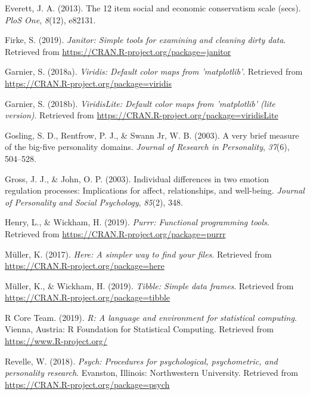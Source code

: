 \documentclass[man]{apa6}
\begin{document}
\leavevmode\hypertarget{ref-everett201312}{}%
Everett, J. A. (2013). The 12 item social and economic conservatism scale (secs). \emph{PloS One}, \emph{8}(12), e82131.

\leavevmode\hypertarget{ref-R-janitor}{}%
Firke, S. (2019). \emph{Janitor: Simple tools for examining and cleaning dirty data}. Retrieved from \url{https://CRAN.R-project.org/package=janitor}

\leavevmode\hypertarget{ref-R-viridis}{}%
Garnier, S. (2018a). \emph{Viridis: Default color maps from 'matplotlib'}. Retrieved from \url{https://CRAN.R-project.org/package=viridis}

\leavevmode\hypertarget{ref-R-viridisLite}{}%
Garnier, S. (2018b). \emph{ViridisLite: Default color maps from 'matplotlib' (lite version)}. Retrieved from \url{https://CRAN.R-project.org/package=viridisLite}

\leavevmode\hypertarget{ref-gosling2003very}{}%
Gosling, S. D., Rentfrow, P. J., \& Swann Jr, W. B. (2003). A very brief measure of the big-five personality domains. \emph{Journal of Research in Personality}, \emph{37}(6), 504--528.

\leavevmode\hypertarget{ref-gross2003individual}{}%
Gross, J. J., \& John, O. P. (2003). Individual differences in two emotion regulation processes: Implications for affect, relationships, and well-being. \emph{Journal of Personality and Social Psychology}, \emph{85}(2), 348.

\leavevmode\hypertarget{ref-R-purrr}{}%
Henry, L., \& Wickham, H. (2019). \emph{Purrr: Functional programming tools}. Retrieved from \url{https://CRAN.R-project.org/package=purrr}

\leavevmode\hypertarget{ref-R-here}{}%
Müller, K. (2017). \emph{Here: A simpler way to find your files}. Retrieved from \url{https://CRAN.R-project.org/package=here}

\leavevmode\hypertarget{ref-R-tibble}{}%
Müller, K., \& Wickham, H. (2019). \emph{Tibble: Simple data frames}. Retrieved from \url{https://CRAN.R-project.org/package=tibble}

\leavevmode\hypertarget{ref-R-base}{}%
R Core Team. (2019). \emph{R: A language and environment for statistical computing}. Vienna, Austria: R Foundation for Statistical Computing. Retrieved from \url{https://www.R-project.org/}

\leavevmode\hypertarget{ref-R-psych}{}%
Revelle, W. (2018). \emph{Psych: Procedures for psychological, psychometric, and personality research}. Evanston, Illinois: Northwestern University. Retrieved from \url{https://CRAN.R-project.org/package=psych}
\end{document}
